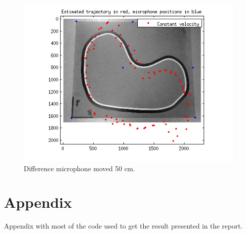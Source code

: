 \documentclass[10pt,a4paper]{report}
\begin{document}
\begin{figure}[H]
\begin{center}
  \includegraphics[width = 350pt]{sens_diff50.png}
  \caption{Difference microphone moved 50 cm.}
  \label{diff_50}
  \end{center}
\end{figure}

\newpage
\chapter{Appendix}
Appendix with most of the code used to get the result presented in the report.









\end{document}
